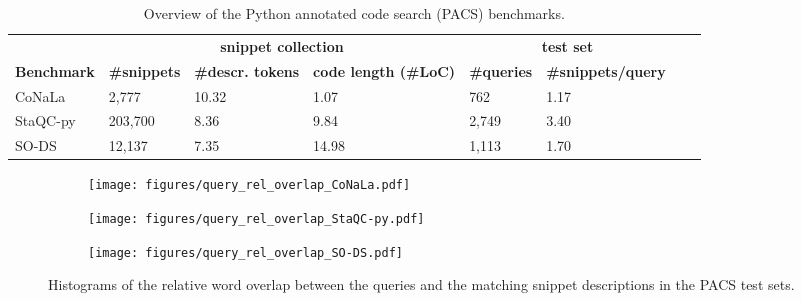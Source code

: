 \documentclass[12pt,conference, onecolumn]{IEEEtran}
\begin{document}
\begin{table}[]
\centering
\small
\begin{tabular}{@{}llllllll@{}}
\toprule
          & \multicolumn{3}{c}{\textbf{snippet collection}}                                  & \multicolumn{2}{c}{\textbf{test set}}                 \\ \cmidrule(l){2-4} \cmidrule(l){5-6}
\textbf{Benchmark} & \textbf{\#snippets} &\textbf{ \#descr. tokens} & \textbf{code length (\#LoC)} & \textbf{\#queries} & \textbf{\#snippets/query} \\ \midrule
CoNaLa    & 2,777             & 10.32                         & 1.07                & 762              & 1.17                      \\
StaQC-py  & 203,700           & 8.36                          & 9.84                & 2,749            & 3.40                      \\
SO-DS     & 12,137            & 7.35                          & 14.98               & 1,113            & 1.70                      \\ \bottomrule
\end{tabular}
\caption{Overview of the Python annotated code search (PACS) benchmarks.\label{tab:pacs}}
\end{table}

 
\begin{figure}
\begin{subfigure}{.47\textwidth}
  \centering
  \texttt{[image: figures/query\_rel\_overlap\_CoNaLa.pdf]}  
  \label{fig:query-overlap-conala}
\end{subfigure}
\begin{subfigure}{.47\textwidth}
  \centering
  \texttt{[image: figures/query\_rel\_overlap\_StaQC-py.pdf]}  
  \label{fig:query-overlap-staqc}
\end{subfigure}
\begin{subfigure}{.47\textwidth}
  \centering
  \texttt{[image: figures/query\_rel\_overlap\_SO-DS.pdf]}  
  \label{fig:query-overlap-so-ds}
\end{subfigure}
\caption{Histograms of the relative word overlap between the queries and the matching snippet descriptions in the PACS test sets.}\label{fig:query_overlap}
\end{figure}
\end{document}
